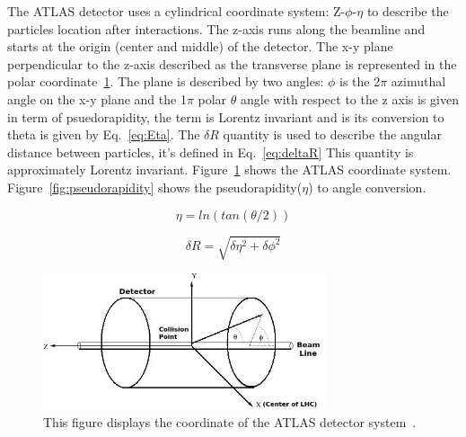 The ATLAS detector uses a cylindrical coordinate system: Z-$\phi$-$\eta$ to describe the particles location after interactions.
The z-axis runs along the beamline and starts at the origin (center and middle) of the detector. The x-y plane perpendicular to the z-axis described as the transverse plane is represented in the polar coordinate~\ref{fig:Coordinates}. The plane is described by two angles: $\phi$ is the 2$\pi$ azimuthal angle on the x-y plane and the 1$\pi$ polar $\theta$ angle with respect to the z axis is given in term of psuedorapidity, the term is Lorentz invariant and is its conversion to theta is given
by Eq.~\ref{eq:Eta}. The $\delta R$ quantity is used to describe the angular distance between particles, it's defined in Eq.~\ref{eq:deltaR} This quantity is approximately Lorentz invariant. Figure~\ref{fig:Coordinates} shows the ATLAS coordinate system. Figure~\ref{fig:pseudorapidity} shows the pseudorapidity($\eta$) to angle conversion. 

\begin{equation}
    \eta=ln(tan(\theta/2))
    \label{eq:Eta}
\end{equation}

\begin{equation}
\delta R=\sqrt{\delta\eta^{2}+\delta\phi^{2}} 
\label{eq:deltaR}
\end{equation}

\begin{figure}[!htb]
    \begin{center}
        \includegraphics[width=0.75\textwidth]{figures/chapter_ATLAS/Coordinates}
        \caption{
            This figure displays the coordinate of the ATLAS detector system~\cite{2008}.
        }
        \label{fig:Coordinates}
    \end{center}
\end{figure}

